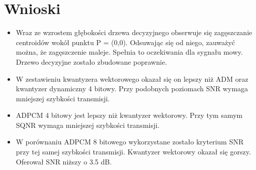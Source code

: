 \documentclass[12pt, a4paper, oneside]{article}
\begin{document}
\section{Wnioski}
\begin{itemize}
\item Wraz ze wzrostem głębokości drzewa decyzyjnego obserwuje się zagęszczanie centroidów wokół punktu P = (0,0). Odsuwając się od niego, zauważyć można, że zagęszczenie maleje. Spełnia to oczekiwania dla sygnału mowy. Drzewo decyzyjne zostało zbudowane poprawnie.
\item W zestawieniu kwantyzera wektorowego okazał się on lepszy niż ADM oraz kwantyzer dynamiczny 4 bitowy. Przy podobnych poziomach SNR wymaga mniejszej szybkości transmisji.
\item ADPCM 4 bitowy jest lepszy niż kwantyzer wektorowy. Przy tym samym SQNR wymaga mniejszej szybkości transmisji.
\item W porównaniu ADPCM 8 bitowego wykorzystane zostało kryterium SNR przy tej samej szybkości transmisji. Kwantyzer wektorowy okazał się gorszy. Oferował SNR niższy o 3.5 dB.
\end{itemize}
\end{document}
